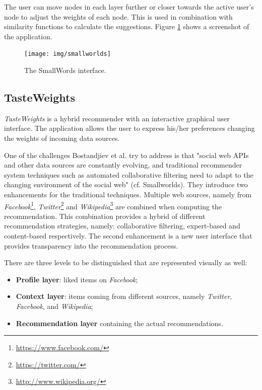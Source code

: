 The user can move nodes in each layer further or closer towards the active user's node to adjust the weights of each node. This is used in combination with similarity functions to calculate the suggestions. Figure \ref{figure:smallworlds} shows a screenshot of the application.

\begin{figure}%
	\begin{center}
		\texttt{[image: img/smallworlds]}%
	\end{center}
	\caption{The SmallWords interface.}%
	\label{figure:smallworlds}%
\end{figure}



\subsection{TasteWeights}\label{chapter:survey:section:applications:subsection:tasteweights}

\emph{TasteWeights} is a hybrid recommender with an interactive graphical user interface\cite{bostandjiev:2012}. The application allows the user to express his/her preferences changing the weights of incoming data sources.

One of the challenges Bostandjiev et al. try to address is that "social web APIs and other data sources are constantly evolving, and traditional recommender system techniques such as automated collaborative filtering need to adapt to the changing environment of the social web"\cite{bostandjiev:2012} (cf. Smallworlds). They introduce two enhancements for the traditional techniques. Multiple web sources, namely from \emph{Facebook}\footnote{\url{https://www.facebook.com/}}, \emph{Twitter}\footnote{\url{https://twitter.com/}} and \emph{Wikipedia}\footnote{\url{http://www.wikipedia.org/}} are combined when computing the recommendation. This combination provides a hybrid of different recommendation strategies, namely: collaborative filtering, expert-based and content-based respectively. The second enhancement is a new user interface that provides transparency into the recommendation process.

There are three levels to be distinguished that are represented visually as well:

\begin{itemize}
	\item \textbf{Profile layer}: liked items on \emph{Facebook};
	\item \textbf{Context layer}: items coming from different sources, namely \emph{Twitter}, \emph{Facebook}, and \emph{Wikipedia};
	\item \textbf{Recommendation layer} containing the actual recommendations.
\end{itemize}

